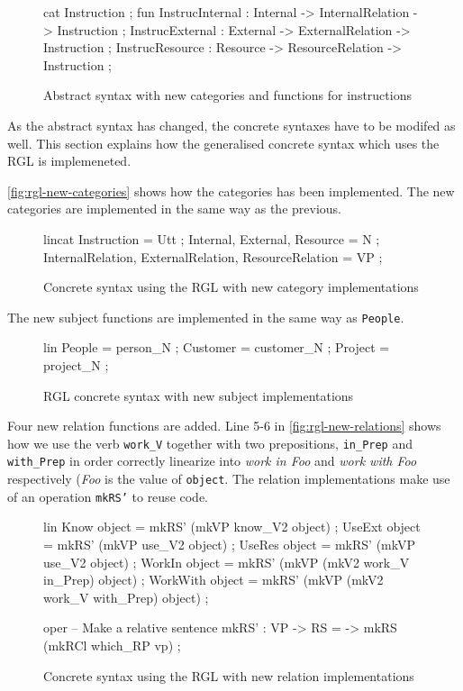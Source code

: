 \begin{figure}[H]
\begin{code}
cat
  Instruction ;
fun
  InstrucInternal : Internal -> InternalRelation -> Instruction ;
  InstrucExternal : External -> ExternalRelation -> Instruction ;
  InstrucResource : Resource -> ResourceRelation -> Instruction ;
\end{code}
\caption{Abstract syntax with new categories and functions for instructions\label{fig:newinstructions}}
\end{figure}

As the abstract syntax has changed, the concrete syntaxes have to be modifed as well. This section explains how the generalised concrete syntax which uses the RGL is implemeneted. 

\autoref{fig:rgl-new-categories} shows how the categories has been implemented. The new categories are implemented in the same way as the previous.

\begin{figure}[H]
\begin{code}
lincat
  Instruction = Utt ;
  Internal, External, Resource = N ;
  InternalRelation, ExternalRelation, ResourceRelation = VP ;
\end{code}
\caption{Concrete syntax using the RGL with new category implementations\label{fig:rgl-new-categories}}
\end{figure}

The new subject functions are implemented in the same way as \texttt{People}.

\begin{figure}[H]
\begin{code}
lin
  People = person_N ;
  Customer = customer_N ;
  Project = project_N ;
\end{code}
\caption{RGL concrete syntax with new subject implementations\label{fig:rgl-new-subjects}}
\end{figure}

Four new relation functions are added. Line 5-6 in \autoref{fig:rgl-new-relations} shows how we use the verb \texttt{work\_V} together with two prepositions, \texttt{in\_Prep} and \texttt{with\_Prep} in order correctly linearize into \emph{work in Foo} and \emph{work with Foo} respectively (\emph{Foo} is the value of \texttt{object}. The relation implementations make use of an operation \texttt{mkRS'} to reuse code.

\begin{figure}[H]
\begin{code}
lin
  Know object = mkRS' (mkVP know_V2 object) ;
  UseExt object = mkRS' (mkVP use_V2 object) ;
  UseRes object = mkRS' (mkVP use_V2 object) ;
  WorkIn object = mkRS' (mkVP (mkV2 work_V in_Prep) object) ;
  WorkWith object = mkRS' (mkVP (mkV2 work_V with_Prep) object) ;

oper
  -- Make a relative sentence
  mkRS' : VP -> RS = \vp -> mkRS (mkRCl which_RP vp) ;
\end{code}
\caption{Concrete syntax using the RGL with new relation implementations\label{fig:rgl-new-relations}}
\end{figure}

